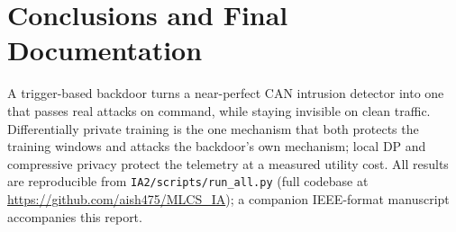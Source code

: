\documentclass[11pt,a4paper]{article}
\begin{document}
\section{Conclusions and Final Documentation}\label{sec:concl}
A trigger-based backdoor turns a near-perfect CAN intrusion detector into one that
passes real attacks on command, while staying invisible on clean traffic.
Differentially private training is the one mechanism that both protects the
training windows and attacks the backdoor's own mechanism; local DP and
compressive privacy protect the telemetry at a measured utility cost. All results
are reproducible from \texttt{IA2/scripts/run\_all.py} (full codebase at
\url{https://github.com/aish475/MLCS_IA}); a companion IEEE-format manuscript
accompanies this report.



\end{document}
